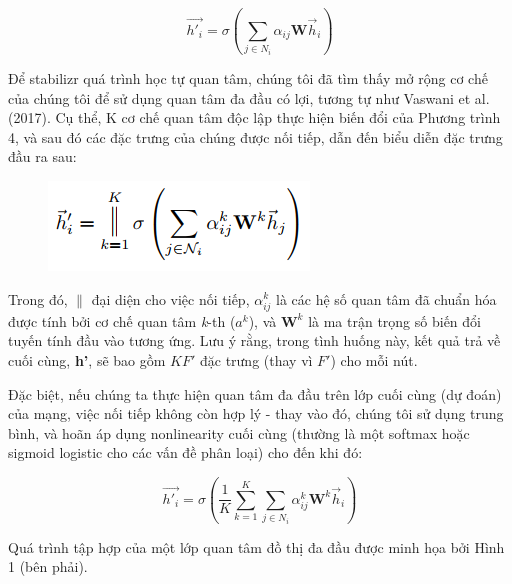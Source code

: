 \[\vec{h'_i} = \sigma ({\displaystyle \sum_{j \in N_i}} \alpha_{ij}\textbf{W}\vec{h}_i)\]

Để stabilizr quá trình học tự quan tâm, chúng tôi đã tìm thấy mở rộng cơ chế của chúng tôi để sử dụng quan tâm đa đầu có lợi, tương tự như Vaswani et al. (2017). Cụ thể, K cơ chế quan tâm độc lập thực hiện biến đổi của Phương trình 4, và sau đó các đặc trưng của chúng được nối tiếp, dẫn đến biểu diễn đặc trưng đầu ra sau:

\begin{figure} [!ht]
	\centering
	\includegraphics[scale = 0.7]{Chapter1/Figs/ct5.png}
	\label{fig:ct1}
\end{figure}

Trong đó, $\|$ đại diện cho việc nối tiếp, $\alpha_{ij}^k$ là các hệ số quan tâm đã chuẩn hóa được tính bởi cơ chế quan tâm \textit{k}-th ($a^k$), và $\textbf{W}^k$ là ma trận trọng số biến đổi tuyến tính đầu vào tương ứng. Lưu ý rằng, trong tình huống này, kết quả trả về cuối cùng, \textbf{h'}, sẽ bao gồm $KF'$ đặc trưng (thay vì $F'$) cho mỗi nút.

Đặc biệt, nếu chúng ta thực hiện quan tâm đa đầu trên lớp cuối cùng (dự đoán) của mạng, việc nối tiếp không còn hợp lý - thay vào đó, chúng tôi sử dụng trung bình, và hoãn áp dụng nonlinearity cuối cùng (thường là một softmax hoặc sigmoid logistic cho các vấn đề phân loại) cho đến khi đó:

\[
\vec{h'_i} = \sigma (
\frac{1}{K}
{\displaystyle \sum_{k=1}^K}
{\displaystyle \sum_{j \in N_i}} 
\alpha_{ij}^k\textbf{W}^k\vec{h}_i)
\]

Quá trình tập hợp của một lớp quan tâm đồ thị đa đầu được minh họa bởi Hình 1 (bên phải).

